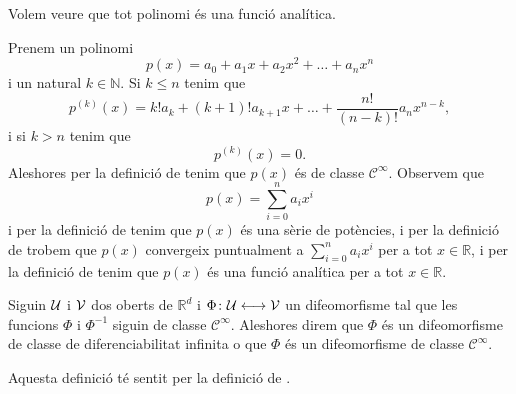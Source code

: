 \documentclass[../Apunts.tex]{subfiles}
\begin{document}
	\begin{example}
		\label{ex:els polinomis són funcions analítiques}
		Volem veure que tot polinomi és una funció analítica.
		\begin{solution}
			Prenem un polinomi
			\[p(x)=a_{0}+a_{1}x+a_{2}x^{2}+\dots+a_{n}x^{n}\]
			i un natural \(k\in\mathbb{N}\). Si \(k\leq n\) tenim que %
			\[p^{(k)}(x)=k!a_{k}+(k+1)!a_{k+1}x+\dots+\frac{n!}{(n-k)!}a_{n}x^{n-k},\]
			i si \(k>n\) tenim que
			\[p^{(k)}(x)=0.\]
			Aleshores per la definició de  tenim que \(p(x)\) és de classe \(\mathcal{C}^{\infty}\). Observem que
			\[p(x)=\sum_{i=0}^{n}a_{i}x^{i}\]
			i per la definició de  tenim que \(p(x)\) és una sèrie de potències, i per la definició de  trobem que \(p(x)\) convergeix puntualment a \(\sum_{i=0}^{n}a_{i}x^{i}\) per a tot \(x\in\mathbb{R}\), i per la definició de  tenim que \(p(x)\) és una funció analítica per a tot \(x\in\mathbb{R}\).
		\end{solution}
	\end{example}
	\begin{definition}
		\label{def:difeomorfisme de classe C infinit}\label{def:difeomorfisme de classe de diferenciabilitat infinita}
		Siguin \(\mathcal{U}\) i \(\mathcal{V}\) dos oberts de \(\mathbb{R}^{d}\) i \(\Phi\colon\mathcal{U}\longleftrightarrow\mathcal{V}\) un difeomorfisme tal que les funcions \(\Phi\) i \(\Phi^{-1}\) siguin de classe \(\mathcal{C}^{\infty}\). Aleshores direm que \(\Phi\) és un difeomorfisme de classe de diferenciabilitat infinita o que \(\Phi\) és un difeomorfisme de classe \(\mathcal{C}^{\infty}\).
		
		Aquesta definició té sentit per la definició de .
	\end{definition}
\end{document}
